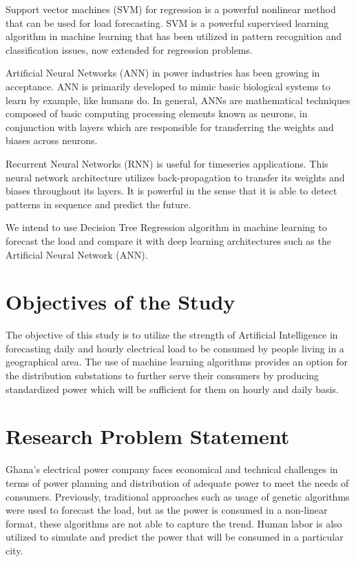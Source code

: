 \documentclass[12pt]{book}
\begin{document}
Support vector machines (SVM) for regression is a powerful nonlinear method that can be used for load forecasting.  SVM is a powerful supervised learning algorithm in machine learning that has been utilized in pattern recognition and classification issues, now extended for regression problems.

Artificial Neural Networks (ANN) in power industries has been growing in acceptance. ANN is primarily developed to mimic basic biological systems to learn by example, like humans do. In general, ANNs are mathematical techniques composed of basic computing processing elements known as neurons, in conjunction with layers which are responsible for transferring the weights and biases across neurons. 

Recurrent Neural Networks (RNN) is useful for timeseries applications. This neural network architecture utilizes back-propagation to transfer its weights and biases throughout its layers. It is powerful in the sense that it is able to detect patterns in sequence and predict the future.

We intend to use Decision Tree Regression algorithm in machine learning to forecast the load and compare it with deep learning architectures such as the Artificial Neural Network (ANN).

\section{Objectives of the Study}
	The objective of this study is to utilize the strength of Artificial Intelligence in forecasting daily and hourly electrical load to be consumed by people living in a geographical area. The use of machine learning algorithms provides an option for the distribution substations to further serve their consumers by producing standardized power which will be sufficient for them on hourly and daily basis.
\section{Research Problem Statement}
	Ghana's electrical power company faces economical and technical challenges in terms of power planning and distribution of adequate power to meet the needs of consumers. Previously, traditional approaches such as usage of genetic algorithms were used to forecast the load, but as the power is consumed in a non-linear format, these algorithms are not able to capture the trend. Human labor is also utilized to simulate and predict the power that will be consumed in a particular city. 
	
\end{document}
